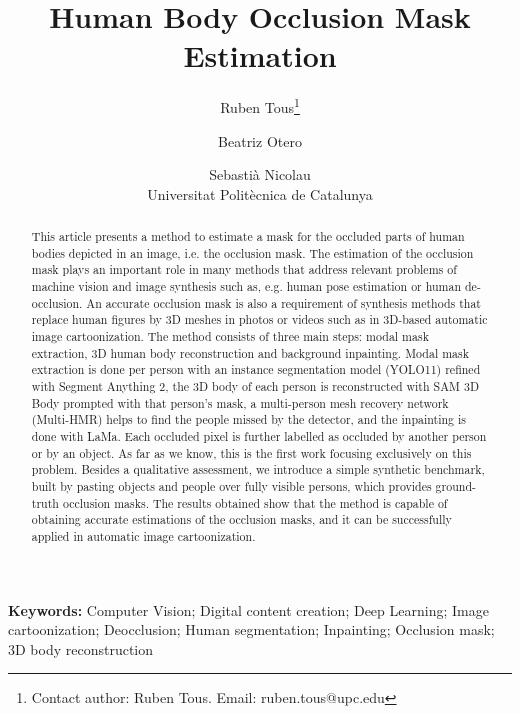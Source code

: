 \documentclass[11pt,a4paper]{article}
\title{Human Body Occlusion Mask Estimation}
\author{Ruben Tous\thanks{Contact author: Ruben Tous. Email: ruben.tous@upc.edu} \and Beatriz Otero \and Sebasti\`a Nicolau\\[0.5ex]
\small Universitat Polit\`ecnica de Catalunya}
\date{}
\begin{document}
\maketitle

\begin{abstract}
This article presents a method to estimate a mask for the occluded parts of human bodies depicted in an image, i.e. the occlusion mask. The
estimation of the occlusion mask plays an important role in many methods
that address relevant problems of machine vision and image synthesis
such as, e.g. human pose estimation or human de-occlusion. An accurate
occlusion mask is also a requirement of synthesis methods that replace
human figures by 3D meshes in photos or videos such as in 3D-based
automatic image cartoonization. The method consists of three main steps:
modal mask extraction, 3D human body reconstruction and background
inpainting. Modal mask extraction is done per person with an instance segmentation model (YOLO11) refined with Segment Anything 2, the 3D body of each person is reconstructed with SAM 3D Body prompted with that person's mask, a multi-person mesh recovery network (Multi-HMR) helps to find the people missed by the detector, and the inpainting is done with LaMa. Each occluded pixel is further labelled as occluded by another person or by an object. As far as we know, this is the
first work focusing exclusively on this problem. Besides a qualitative assessment, we introduce a simple synthetic benchmark, built by pasting objects and people over fully visible persons, which provides ground-truth occlusion masks. The results obtained
show that the method is capable of obtaining accurate estimations of the
occlusion masks, and it can be successfully applied in automatic image
cartoonization.
\end{abstract}

\noindent\textbf{Keywords:} Computer Vision; Digital content creation; Deep Learning; Image cartoonization; Deocclusion; Human segmentation; Inpainting; Occlusion mask; 3D body reconstruction

\end{document}
